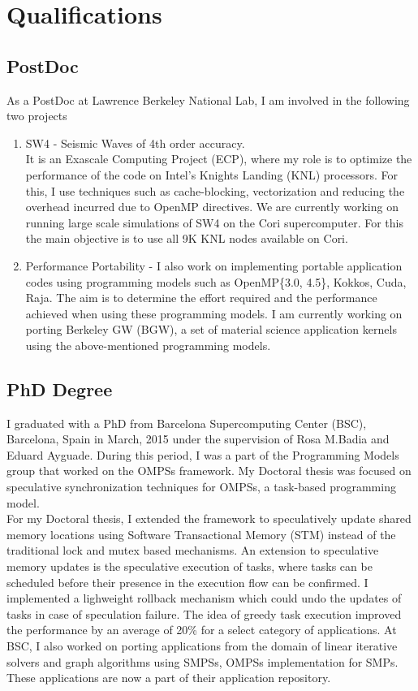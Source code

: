 \documentclass[a4paper]{article}
\begin{document}
\section{Qualifications}
\subsection{PostDoc}
As a PostDoc at Lawrence Berkeley National Lab, I am involved in the following two projects
\begin{enumerate}
\item {SW4} - Seismic Waves of 4th order accuracy. \\
    It is an Exascale Computing Project (ECP), where my role is to optimize the  performance of the code on Intel's Knights Landing (KNL) processors.
    For this, I use techniques such as cache-blocking, vectorization and reducing the overhead incurred due to OpenMP directives.
    We are currently working on running large scale simulations of SW4 on the Cori supercomputer. For this the main objective is to use all 9K KNL nodes available on Cori.

\item {Performance Portability} - I also work on implementing portable application codes using programming models such as OpenMP\{3.0, 4.5\}, Kokkos, Cuda, Raja.
    The aim is to determine the effort required and the performance achieved when using these programming models.
    I am currently working on porting Berkeley GW (BGW), a set of material science application kernels using the above-mentioned programming models.
\end{enumerate}

\subsection{PhD Degree}
I graduated with a PhD from Barcelona Supercomputing Center (BSC), Barcelona, Spain in March, 2015 under the supervision of Rosa M.Badia and Eduard Ayguade.
During this period, I was a part of the Programming Models group that worked on the OMPSs framework.
My Doctoral thesis was focused on speculative synchronization techniques for OMPSs, a task-based programming model.\\
For my Doctoral thesis, I extended the framework to speculatively update shared memory locations using Software Transactional Memory (STM) instead of the traditional lock and mutex based mechanisms.
An extension to speculative memory updates is the speculative execution of tasks, where tasks can be scheduled before their presence in the execution flow can be confirmed.
I implemented a lighweight rollback mechanism which could undo the updates of tasks in case of speculation failure.
The idea of greedy task execution improved the performance by an average of 20\% for a select category of applications.
At BSC, I also worked on porting applications from the domain of linear iterative solvers and graph algorithms using SMPSs, OMPSs implementation for SMPs.
These applications are now a part of their application repository.




\end{document}
